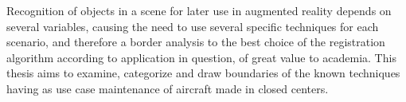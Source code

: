 Recognition of objects in a scene for later use in augmented reality depends on several variables, causing the need 
to use several specific techniques for each scenario, and therefore a border
analysis to the best choice of the registration algorithm according to
application in question, of great value to academia.
This thesis aims to examine, categorize and draw boundaries of the known techniques having as use case maintenance of 
aircraft made in closed centers.